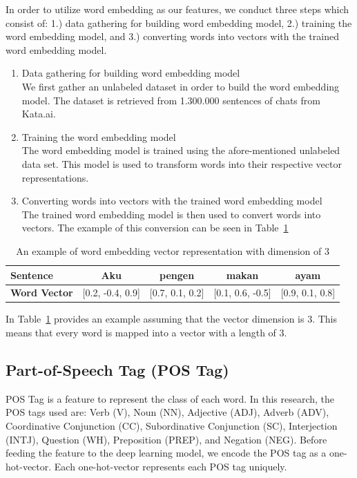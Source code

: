In order to utilize word embedding as our features, we conduct three steps which consist of: 1.) data gathering for building word embedding model, 2.) training the word embedding model, and 3.) converting words into vectors with the trained word embedding model.

\begin{enumerate}
	\item Data gathering for building word embedding model\\
	We first gather an unlabeled dataset in order to build the word embedding model. The dataset is retrieved from 1.300.000 sentences of chats from Kata.ai.
	
	\item Training the word embedding model\\
	The word embedding model is trained using the afore-mentioned unlabeled data set. This model is used to transform words into their respective vector representations.
	
	\item Converting words into vectors with the trained word embedding model\\
	The trained word embedding model is then used to convert words into vectors. The example of this conversion can be seen in Table~\ref{tab:examplewe}
\end{enumerate}

\begin{table}
	\centering
	\caption{An example of word embedding vector representation with dimension of 3}
	\label{tab:examplewe}
	\begin{tabular}{|lcccc|}
		\hline
		\textbf{Sentence} 				& Aku & pengen & makan & ayam \\
		\hline
		\textbf{Word Vector}		& [0.2, -0.4, 0.9] & [0.7, 0.1, 0.2] & [0.1, 0.6, -0.5] & [0.9, 0.1, 0.8] \\
		\hline
	\end{tabular}
\end{table}

In Table~\ref{tab:examplewe} provides an example assuming that the vector dimension is 3. This means that every word is mapped into a vector with a length of 3.

\subsection{Part-of-Speech Tag (POS Tag)}
POS Tag is a feature to represent the class of each word. In this research, the POS tags used are: Verb (V), Noun (NN), Adjective (ADJ), Adverb (ADV), Coordinative Conjunction (CC), Subordinative Conjunction (SC), Interjection (INTJ), Question (WH), Preposition (PREP), and Negation (NEG). Before feeding the feature to the deep learning model, we encode the POS tag as a one-hot-vector. Each one-hot-vector represents each POS tag uniquely.

